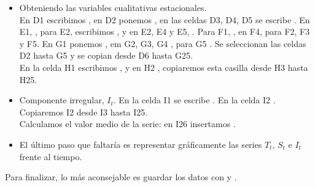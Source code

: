 \begin{itemize}

\item Obteniendo las variables cualitativas estacionales.\\
En D1 escribimos , en D2 ponemos , en las celdas D3, D4, D5 se
escribe . En E1, , para E2, escribimos , y en E2, E4 y
E5, . Para F1, ,  en F4,  para F2, F3 y F5.
En G1 ponemos , em G2, G3, G4 , para G5 .
Se seleccionan las celdas D2 hasta G5 y se copian desde D6 hasta G25.\\
En la celda H1 escribimos , y en H2 ,
copiaremos esta casilla desde H3 hasta H25.

\item Componente irregular, \(I_{t}\).
En la celda I1 se escribe . En la celda I2 . Copiaremos
I2 desde I3 hasta I25.\\
Calculamos el valor medio de la serie: en I26 insertamos .

\item El último paso que faltaría es representar gráficamente las series \(T_{t}\),
\(S_{t}\) e \(I_{t}\) frente al tiempo.

\end{itemize}


Para finalizar, lo más aconsejable es guardar los datos con  y
.





